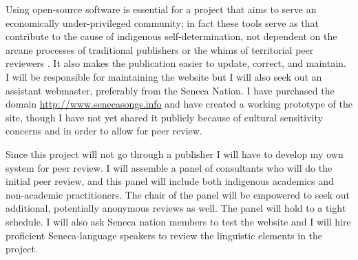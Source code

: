 \documentclass{neh}
\begin{document}
Using open-source software is essential for a project that aims to serve an
economically under-privileged community; in fact these tools serve as
 that contribute to the cause of indigenous
self-determination, not dependent on the arcane processes of traditional
publishers or the whims of territorial peer reviewers
\autocite[\XXX]{BasicCall}.
It also makes the publication easier to update, correct, and maintain.
I will be responsible for maintaining the website but I will also seek out an
assistant webmaster, preferably from the Seneca Nation.
I have purchased the domain \url{http://www.senecasongs.info} and have created
a working prototype of the site, though I have not yet shared it publicly
because of cultural sensitivity concerns and in order to allow for peer
review.

Since this project will not go through a publisher I will have to develop my
own system for peer review.
I will assemble a panel of consultants who will do the initial peer review,
and this panel will include both indigenous academics and non-academic
practitioners.
The chair of the panel will be empowered to seek out additional, potentially
anonymous reviews as well.
The panel will hold to a tight schedule.
I will also ask Seneca nation members to test the website and I will hire
proficient Seneca-language speakers to review the linguistic elements in the
project.
\end{document}
